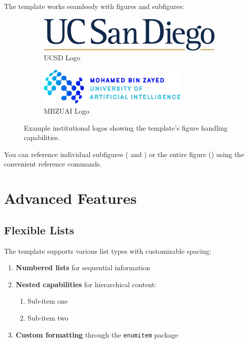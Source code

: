 \documentclass{triton}
\begin{document}
The template works seamlessly with figures and subfigures:

\begin{figure}[htbp]
    \centering
    \begin{subfigure}{0.45\textwidth}
        \centering
        \includegraphics[width=\textwidth]{assets/ucsd-logo.png}
        \caption{UCSD Logo}
        \label{fig:ucsd}
    \end{subfigure}
    \hfill
    \begin{subfigure}{0.45\textwidth}
        \centering
        \includegraphics[width=0.8\textwidth]{assets/mbzuai-logo.png}
        \caption{MBZUAI Logo}
        \label{fig:mbzuai}
    \end{subfigure}
    \caption{Example institutional logos showing the template's figure handling capabilities.}
    \label{fig:logos}
\end{figure}

You can reference individual subfigures ( and ) or the entire figure () using the convenient reference commands.

\section{Advanced Features}

\subsection{Flexible Lists}

The template supports various list types with customizable spacing:

\begin{enumerate}[leftmargin=20pt]
    \item \textbf{Numbered lists} for sequential information
    \item \textbf{Nested capabilities} for hierarchical content:
    \begin{enumerate}[label=(\alph*)]
        \item Sub-item one
        \item Sub-item two
    \end{enumerate}
    \item \textbf{Custom formatting} through the \texttt{enumitem} package
\end{enumerate}
\end{document}
